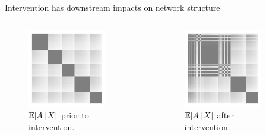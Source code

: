 \documentclass[aspectratio=169]{beamer}
\theoremstyle{remark}
\begin{document}
\begin{frame}{Intervention has downstream impacts on network structure}
    \begin{columns}
        \begin{column}{0.5\textwidth}
            \begin{figure}
                \centering
                \includegraphics[width=0.8\textwidth]{figures/canonical-intervention/expected-a-pre-trt.pdf}
                \caption{$\E[X]{A}$ prior to intervention.}
            \end{figure}
        \end{column}
        \begin{column}{0.5\textwidth}
            \begin{figure}
                \centering
                \includegraphics[width=0.8\textwidth]{figures/canonical-intervention/expected-a-post-trt.pdf}
                \caption{$\E[X]{A}$ after intervention.}
            \end{figure}
        \end{column}
    \end{columns}
\end{frame}
\end{document}
